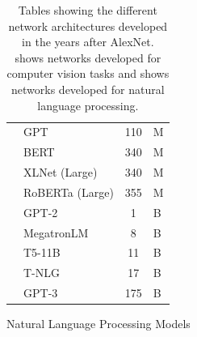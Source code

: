 \begin{table}[t]
\begin{subfigure}[b]{\textwidth}
\begin{tabular}{
      L{5cm}
      L{3cm}
      S[table-format=3.0, table-text-alignment=left]@{\,}
      s[table-unit-alignment=left]
    }
      \citet{radford2018improving}   & GPT             & 110 & \si{M} \\
      \citet{devlin2019bert}         & BERT            & 340 & \si{M} \\
      \citet{yang2019xlnet}          & XLNet (Large)   & 340 & \si{M} \\
      \citet{liu2019roberta}         & RoBERTa (Large) & 355 & \si{M} \\
      \citet{radford2019language}    & GPT-2           &   1 & \si{B} \\
      \citet{shoeybi2019megatron}    & MegatronLM      &   8 & \si{B} \\
      \citet{raffel2020exploring}    & T5-11B          &  11 & \si{B} \\
      \citet{rosset2020turingnlg}    & T-NLG           &  17 & \si{B} \\
      \citet{brown2020language}      & GPT-3           & 175 & \si{B} \\
      \bottomrule
    \end{tabular}
    \caption{Natural Language Processing Models}
    \label{table:ch1-networks_parameters_nlp}
  \end{subfigure}
  \caption{
    Tables showing the different network architectures developed in the years after AlexNet.
     shows networks developed for computer vision tasks and  shows networks developed for natural language processing.
  }
  \label{table:ch1-networks_parameters}
\end{table}


